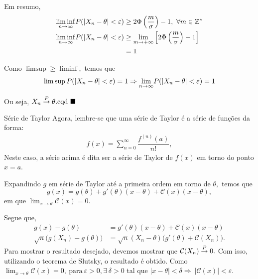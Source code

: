 \documentclass[12pt]{beamer}
\begin{document}
\begin{frame}{}
\begin{block}{}
\justifying
Em resumo,
\begin{align*}
    {\displaystyle \liminf_{n\to\infty}} P(|X_{n}-\theta|<\varepsilon)&\geq 2\Phi\left(\frac{m}{\sigma}\right)-1,~\forall m\in \mathbb{Z}^{*}\\  
    {\displaystyle \liminf_{n\to\infty}} P(|X_{n}-\theta|<\varepsilon)&\geq \lim_{m\rightarrow +\infty} \Big[2\Phi\left(\frac{m}{\sigma}\right)-1\Big]\\
    &=1
\end{align*}
\end{block}
\pause
\begin{block}{}
\justifying
Como $\limsup\geq \liminf,$ temos que
\begin{align}\label{num1}
    \limsup P(|X_{n}-\theta|<\varepsilon)=1\Rightarrow {\displaystyle \lim_{n\to\infty}} P(|X_{n}-\theta|<\varepsilon)=1
\end{align}
\end{block}
\pause
\begin{block}{}
\justifying
Ou seja, $X_{n}\overset{P}{\rightarrow} \theta. \text{cqd}~\blacksquare$
\end{block}
\end{frame}

\begin{frame}{}
	\begin{block}{Série de Taylor}
		\justifying
		Agora, lembre-se que uma série de Taylor é a série de funções da forma:
		\begin{align*}
			f(x)=\displaystyle{\sum_{n=0}^{\infty}\dfrac{f^{(n)}(a)}{n!}},
		\end{align*}
Neste caso, a série acima é dita ser a série de Taylor de $f(x)$ em torno do ponto $x=a$.
	\end{block}
	\pause
	\begin{block}{}
		\justifying
		Expandindo $g$ em série de Taylor até a primeira ordem em torno de $\theta,$ temos que $$g(x)=g(\theta)+g'(\theta)(x-\theta)+\mathcal{C}(x)(x-\theta),$$ em que ${\displaystyle \lim_{x\rightarrow \theta} \mathcal{C}(x)=0}.$
	\end{block}
\end{frame}

\begin{frame}{}
\begin{block}{}
\justifying
Segue que, 
\begin{align*}
g(x)-g(\theta)&=g'(\theta)(x-\theta)+\mathcal{C}(x)(x-\theta)\\
\sqrt{n}\big(g(X_{n})-g(\theta)\big)&=\sqrt{n}(X_{n}-\theta)\big(g'(\theta)+\mathcal{C}(X_{n})\big).
\end{align*}
Para mostrar o resultado desejado, devemos mostrar que $\mathcal{C}(X_{n})\overset{P}{\rightarrow} 0.$ Com isso, utilizando o teorema de Slutsky, o resultado é obtido. Como ${\displaystyle \lim_{x\rightarrow \theta} \mathcal{C}(x)=0},~\text{para}~\varepsilon>0, \exists~\delta>0$ tal que $|x-\theta|<\delta\Rightarrow~|\mathcal{C}(x)|<\varepsilon.$
\end{block}
\end{frame}
\end{document}
